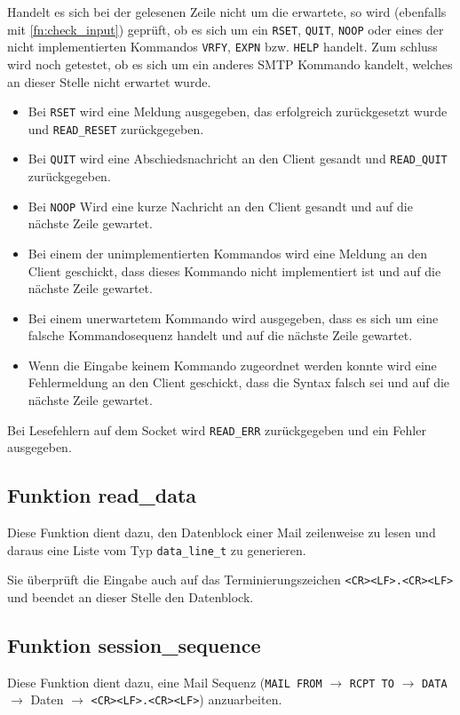 \documentclass[pdftex,final,a4paper,10pt,notitlepage,halfparskip]{scrreprt}
\begin{document}
Handelt es sich bei der gelesenen Zeile nicht um die erwartete, so wird (ebenfalls mit \ref{fn:check_input}) geprüft, ob es sich um ein \texttt{RSET}, \texttt{QUIT}, \texttt{NOOP} oder eines der nicht implementierten Kommandos \texttt{VRFY}, \texttt{EXPN} bzw. \texttt{HELP} handelt. Zum schluss wird noch getestet, ob es sich um ein anderes SMTP Kommando kandelt, welches an dieser Stelle nicht erwartet wurde.
\begin{itemize}
  \item Bei \texttt{RSET} wird eine Meldung ausgegeben, das erfolgreich zurückgesetzt wurde und \texttt{READ\_RESET} zurückgegeben. 
  \item Bei \texttt{QUIT} wird eine Abschiedsnachricht an den Client gesandt und \texttt{READ\_QUIT} zurückgegeben. 
  \item Bei \texttt{NOOP} Wird eine kurze Nachricht an den Client gesandt und auf die nächste Zeile gewartet.
  \item Bei einem der unimplementierten Kommandos wird eine Meldung an den Client geschickt, dass dieses Kommando nicht implementiert ist und auf die nächste Zeile gewartet.
  \item Bei einem unerwartetem Kommando wird ausgegeben, dass es sich um eine  falsche Kommandosequenz handelt und auf die nächste Zeile gewartet.
  \item Wenn die Eingabe keinem Kommando zugeordnet werden konnte wird eine Fehlermeldung an den Client geschickt, dass die Syntax falsch sei und auf die nächste Zeile gewartet. 
\end{itemize}

Bei Lesefehlern auf dem Socket wird \texttt{READ\_ERR} zurückgegeben und ein Fehler ausgegeben.

\subsection{Funktion read\_data}\label{fn:read_data}
Diese Funktion dient dazu, den Datenblock einer Mail zeilenweise zu lesen und daraus eine Liste vom Typ \texttt{data\_line\_t} zu generieren.

Sie überprüft die Eingabe auch auf das Terminierungszeichen \texttt{<CR><LF>.<CR><LF>} und beendet an dieser Stelle den Datenblock.


\subsection{Funktion session\_sequence}\label{fn:session_sequence}
Diese Funktion dient dazu, eine Mail Sequenz (\texttt{MAIL FROM} $\rightarrow$ \texttt{RCPT TO} $\rightarrow$ \texttt{DATA} $\rightarrow$ Daten $\rightarrow$ \texttt{<CR><LF>.<CR><LF>}) anzuarbeiten.
\end{document}
